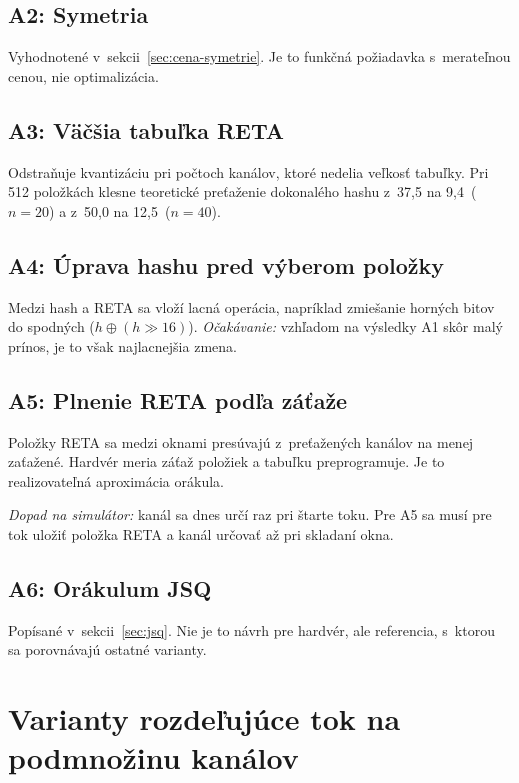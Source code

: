 \subsection*{A2: Symetria}
Vyhodnotené v~sekcii~\ref{sec:cena-symetrie}. Je to funkčná požiadavka s~merateľnou cenou,
nie optimalizácia.

\subsection*{A3: Väčšia tabuľka RETA}
Odstraňuje kvantizáciu pri počtoch kanálov, ktoré nedelia veľkosť tabuľky. Pri 512 položkách
klesne teoretické preťaženie dokonalého hashu z~37,5 na 9,4\,\textperthousand{} ($n=20$)
a z~50,0 na 12,5\,\textperthousand{} ($n=40$). 

\subsection*{A4: Úprava hashu pred výberom položky}
Medzi hash a RETA sa vloží lacná operácia, napríklad zmiešanie horných bitov do spodných
($h \oplus (h \gg 16)$). \emph{Očakávanie:} vzhľadom na výsledky A1 skôr malý prínos, je to však
najlacnejšia zmena.

\subsection*{A5: Plnenie RETA podľa záťaže}
Položky RETA sa medzi oknami presúvajú z~preťažených kanálov na menej zaťažené. Hardvér meria
záťaž položiek a tabuľku preprogramuje. Je to realizovateľná aproximácia orákula.

\emph{Dopad na simulátor:} kanál sa dnes určí raz pri štarte toku. Pre A5 sa musí pre tok uložiť
položka RETA a kanál určovať až pri skladaní okna.

\subsection*{A6: Orákulum JSQ}
Popísané v~sekcii~\ref{sec:jsq}. Nie je to návrh pre hardvér, ale referencia, s~ktorou sa
porovnávajú ostatné varianty.

\section{Varianty rozdeľujúce tok na podmnožinu kanálov}

